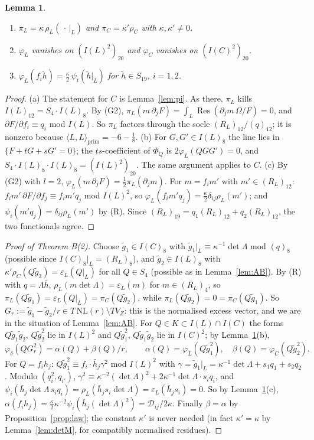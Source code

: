 \documentclass[11pt]{article}
\numberwithin{equation}{section}
\newtheorem{lemma}[theorem]{Lemma}
\theoremstyle{remark}
\newcommand{\NL}{\mathrm{NL}}
\newcommand{\VZ}{V_Z}
\newcommand{\cD}{\mathcal{D}}
\newcommand{\Res}{\operatorname{Res}}
\newcommand{\gt}{\tilde g}
\begin{document}
\begin{lemma}\label{lem:oct}
\begin{enumerate}[label=\textup{(\alph*)}]
\item $\pi_L=\kappa\,\rho_L(\,\cdot\,|_L)$ and $\pi_C=\kappa'\rho_C$ with $\kappa,\kappa'\ne0$.
\item $\varphi_L$ vanishes on $(I(L)^2)_{20}$ and $\varphi_C$ vanishes on $(I(C)^2)_{20}$.
\item $\varphi_L(f_i\tilde h)=\frac\kappa2\,\psi_i(\tilde h|_L)$ for $\tilde h\in S_{19}$, $i=1,2$.
\end{enumerate}
\end{lemma}
\begin{proof}
(a) The statement for $C$ is Lemma~\ref{lem:pi}. As there, $\pi_L$ kills $I(L)_{12}=S_4\cdot I(L)_8$. By (G2),
$\pi_L(m\,\partial_jF)=\int_L\Res(\partial_jm\,\Omega/F)=0$, and $\partial F/\partial f_i\equiv q_i$ mod $I(L)$.
So $\pi_L$ factors through the socle $(R_L)_{12}/(q)_{12}$; it is nonzero because
$\langle L,L\rangle_{\mathrm{prim}}=-6-\frac18$.
(b) For $G,G'\in I(L)_8$ the line lies in $\{F+tG+sG'=0\}$; the $ts$-coefficient of $\Phi_Q$ is
$2\varphi_L(QGG')=0$, and $S_4\cdot I(L)_8\cdot I(L)_8=(I(L)^2)_{20}$. The same argument applies to $C$.
(c) By (G2) with $l=2$, $\varphi_L(m\,\partial_jF)=\frac12\pi_L(\partial_jm)$. For $m=f_im'$ with
$m'\in(R_L)_{12}$: $f_im'\,\partial F/\partial f_j\equiv f_im'q_j$ mod $I(L)^2$, so
$\varphi_L(f_im'q_j)=\frac\kappa2\delta_{ij}\rho_L(m')$; and $\psi_i(m'q_j)=\delta_{ij}\rho_L(m')$ by (R). Since
$(R_L)_{19}=q_1(R_L)_{12}+q_2(R_L)_{12}$, the two functionals agree.
\end{proof}

\begin{proof}[Proof of Theorem B(2)]
Choose $\gt_1\in I(C)_8$ with $\gt_1|_L\equiv\kappa^{-1}\det\Lambda$ mod $(q)_8$ (possible since
$I(C)_8|_L=(R_L)_8$), and $\gt_2\in I(L)_8$ with $\kappa'\rho_C(Q\gt_2)=\varepsilon_L(Q|_L)$ for all $Q\in S_4$
(possible as in Lemma~\ref{lem:AB}). By (R) with $q=\Lambda\bar h$, $\rho_L(m\det\Lambda)=\varepsilon_L(m)$ for
$m\in(R_L)_4$, so $\pi_L(Q\gt_1)=\varepsilon_L(Q|_L)=\pi_C(Q\gt_2)$, while $\pi_L(Q\gt_2)=0=\pi_C(Q\gt_1)$. So
$G_r:=\gt_1-\gt_2/r\in T\,\NL(r)\setminus T\VZ$: this is the normalised excess vector, and we are in the
situation of Lemma~\ref{lem:AB}. For $Q\in K\subset I(L)\cap I(C)$ the forms $Q\gt_1\gt_2$, $Q\gt_2^2$ lie in
$I(L)^2$ and $Q\gt_1^2$, $Q\gt_1\gt_2$ lie in $I(C)^2$; by Lemma~\ref{lem:oct}(b),
\[
\varphi_\delta(QG_r^2)=\alpha(Q)+\beta(Q)/r,\qquad\alpha(Q)=\varphi_L(Q\gt_1^2),\quad\beta(Q)=\varphi_C(Q\gt_2^2).
\]
For $Q=f_ih_j$: $Q\gt_1^2\equiv f_i\cdot\bar h_j\gamma^2$ mod $I(L)^2$ with
$\gamma=\gt_1|_L=\kappa^{-1}\det\Lambda+s_1q_1+s_2q_2$. Modulo $(q_i^2,q_{i'})$,
$\gamma^2\equiv\kappa^{-2}(\det\Lambda)^2+2\kappa^{-1}\det\Lambda\cdot s_iq_i$, and
$\psi_i(\bar h_j\det\Lambda\,s_iq_i)=\rho_L(\bar h_js_i\det\Lambda)=\varepsilon_L(\bar h_js_i)=0$. So by
Lemma~\ref{lem:oct}(c), $\alpha(f_ih_j)=\frac\kappa2\kappa^{-2}\psi_i(\bar h_j(\det\Lambda)^2)=\cD_{ij}/2\kappa$.
Finally $\beta=\alpha$ by Proposition~\ref{prop:law}; the constant $\kappa'$ is never needed (in fact
$\kappa'=\kappa$ by Lemma~\ref{lem:detM}, for compatibly normalised residues).
\end{proof}
\end{document}
